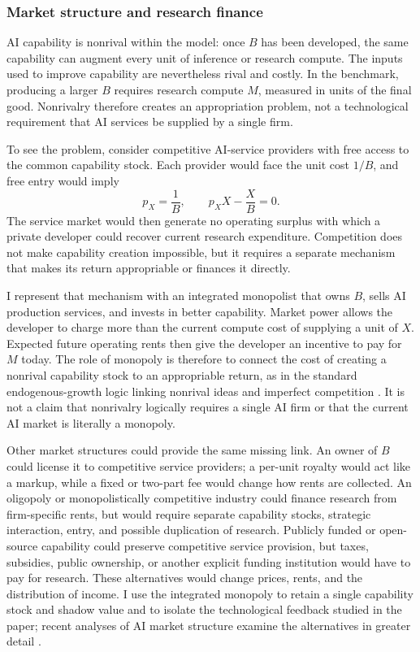 \subsubsection{Market structure and research finance}

AI capability is nonrival within the model: once \(B\) has been developed, the
same capability can augment every unit of inference or research compute. The
inputs used to improve capability are nevertheless rival and costly. In the
benchmark, producing a larger \(B\) requires research compute \(M\), measured in
units of the final good. Nonrivalry therefore creates an appropriation problem,
not a technological requirement that AI services be supplied by a single firm.

To see the problem, consider competitive AI-service providers with free access
to the common capability stock. Each provider would face the unit cost \(1/B\),
and free entry would imply
\begin{equation}
 p_X=\frac{1}{B},
 \qquad
 p_XX-\frac{X}{B}=0.
 \label{eq:axm-competitive-ai-services}
\end{equation}
The service market would then generate no operating surplus with which a
private developer could recover current research expenditure. Competition does
not make capability creation impossible, but it requires a separate mechanism
that makes its return appropriable or finances it directly.

I represent that mechanism with an integrated monopolist that owns \(B\), sells
AI production services, and invests in better capability. Market power allows
the developer to charge more than the current compute cost of supplying a unit
of \(X\). Expected future operating rents then give the developer an incentive
to pay for \(M\) today. The role of monopoly is therefore to connect the cost of
creating a nonrival capability stock to an appropriable return, as in the
standard endogenous-growth logic linking nonrival ideas and imperfect
competition \citep{romer1990}. It is not a claim that nonrivalry logically
requires a single AI firm or that the current AI market is literally a
monopoly.

Other market structures could provide the same missing link. An owner of \(B\)
could license it to competitive service providers; a per-unit royalty would
act like a markup, while a fixed or two-part fee would change how rents are
collected. An oligopoly or monopolistically competitive industry could finance
research from firm-specific rents, but would require separate capability stocks,
strategic interaction, entry, and possible duplication of research. Publicly
funded or open-source capability could preserve competitive service provision,
but taxes, subsidies, public ownership, or another explicit funding institution
would have to pay for research. These alternatives would change prices, rents,
and the distribution of income. I use the integrated monopoly to retain a
single capability stock and shadow value and to isolate the technological
feedback studied in the paper; recent analyses of AI market structure examine
the alternatives in greater detail
\citep{korinekvipra2025,gans2024,demireretal2025}.

